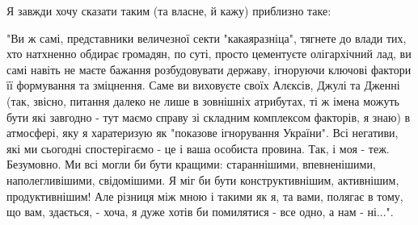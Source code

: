 Я завжди хочу сказати таким (та власне, й кажу) приблизно таке: 

"Ви ж самі, представники величезної секти "какаяразніца", тягнете до влади тих,
хто натхненно обдирає громадян, по суті, просто цементуєте олігархічний лад, ви
самі навіть не маєте бажання розбудовувати державу, ігноруючи ключові фактори
її формування та зміцнення. Саме ви виховуєте своїх Алєксів, Джулі та Дженні
(так, звісно, питання далеко не лише в зовнішніх атрибутах, ті ж імена можуть
бути які завгодно - тут маємо справу зі складним комплексом факторів, я знаю) в
атмосфері, яку я харатеризую як "показове ігнорування України". Всі негативи,
які ми сьогодні спостерігаємо - це і ваша особиста провина. Так, і моя - теж.
Безумовно. Ми всі могли би бути кращими: стараннішими, впевненішими,
наполегливішими, свідомішими. Я міг би бути конструктивнішим, активнішим,
продуктивнішим! Але різниця між мною і такими як я, та вами, полягає в тому, що
вам, здається, - хоча, я дуже хотів би помилятися - все одно, а нам - ні...".

